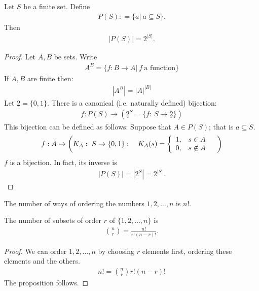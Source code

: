 \begin{pp}
	Let $S$ be a finite set. Define
	\begin{align*}
	P(S) : = \{ a|~ a \subseteq S \}.
	\end{align*}
	Then 
	\begin{align*}
	|P(S)| = 2^{|S|}.
	\end{align*}
\end{pp}
	\begin{proof}
		Let $A,B$ be sets. Write
		\begin{align*}
		A^B = \{ f: B \to A| ~ f~ \text{a function} \}
		\end{align*}
		If $A,B$ are finite then:
		\begin{align*}
		\left| A^B \right| = |A|^{|B|}
		\end{align*}
		Let $\underline 2 = \{0,1\}$. There is a canonical (i.e. naturally defined) bijection:
		\begin{align*}
		f: P(S) \to \left(\underline{2}^S = \{f:~ S \to \underline 2 \} \right)
		\end{align*}
		This bijection can be defined as follows: Suppose that $A \in P(S)$; that is $a \subseteq S$.
		\begin{align*}
		f: A \mapsto \left( K_A: ~ S \to \{0,1\} : \quad  K_A(s) = 
		\left\{
		\begin{array}{l l}
		1, & s \in A \\
		0, & s \not\in A
		\end{array}\right. \quad  \right)
		\end{align*}
		$f$ is a bijection. In fact, its inverse is
		\begin{align*}
		|P(S)| = |2^S| = 2^{|S|}.
		\end{align*}
	\end{proof}



\begin{pp}
	The number of ways of ordering the numbers $1,2, \dots ,n$ is $n!$.
\end{pp}

\begin{pp}
	The number of subsets of order $r$ of $\{1,2, \dots, n\}$ is
	\begin{align*}
	 \binom n r = \frac{n!}{r!(n-r)!}.
	\end{align*}
\end{pp}

\begin{proof}
	We can order $1,2, \dots,n$ by choosing $r$ elements first, ordering these elements and the others.
	\begin{align*}
	n! = \binom n r r! (n-r)!
	\end{align*}
	The proposition follows.
\end{proof}


